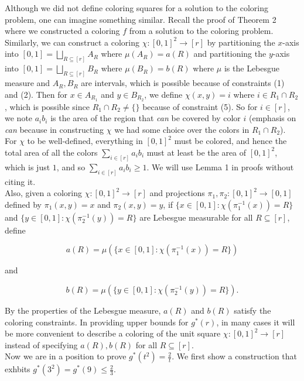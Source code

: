 \documentclass{article}
\begin{document}
Although we did not define coloring squares for a solution to the coloring problem, one can imagine something similar. Recall the proof of Theorem 2 where we constructed a coloring $f$ from a solution to the coloring problem. Similarly, we can construct a coloring $ \chi: [0,1]^2 \rightarrow [r]$ by partitioning the $x$-axis into $[0,1] = \bigsqcup_{R \subseteq [r]} A_R$ where $\mu (A_R) = a(R)$ and partitioning the $y$-axis into $[0,1] = \bigsqcup_{R \subseteq [r]} B_R$ where $\mu(B_R) = b(R)$ where $\mu$ is the Lebesgue measure and $A_R,B_R$ are intervals, which is possible because of constraints (1) and (2). Then for $x \in A_{R_1}$ and $y \in B_{R_2}$, we define $\chi (x,y) = i$ where $i \in R_1 \cap R_2$, which is possible since $R_1 \cap R_2 \neq \{\}$ because of constraint (5). So for $i \in [r]$, we note $a_ib_i$ is the area of the region that \textit{can} be covered by color $i$ (emphasis on \textit{can} because in constructing $\chi$ we had some choice over the colors in $R_1 \cap R_2$). For $\chi$ to be well-defined, everything in $[0,1]^2$ must be colored, and hence the total area of all the colors $\sum_{i \in [r]} a_ib_i$ must at least be the area of $[0,1]^2$, which is just $1$, and so  $\sum_{i \in [r]} a_ib_i \geq 1$. We will use Lemma 1 in proofs without citing it. \\

Also, given a coloring $\chi : [0,1]^2 \rightarrow [r]$ and projections $\pi_1,\pi_2 : [0,1]^2 \rightarrow [0,1]$ defined by $\pi_1(x,y) = x$ and $\pi_2(x,y) = y$, if $\{x \in [0,1] : \chi(\pi_1^{-1}(x)) = R\}$ and $\{y \in [0,1] : \chi(\pi_2^{-1}(y)) = R\}$ are  Lebesgue measurable for all $R \subseteq [r]$, define

$$a(R) = \mu(\{x \in [0,1] : \chi(\pi_1^{-1}(x)) = R\})$$

\noindent
and

$$b(R) = \mu(\{y \in [0,1] : \chi(\pi_2^{-1}(y)) = R\}).$$

\noindent
 By the properties of the Lebesgue measure, $a(R)$ and $b(R)$ satisfy the coloring constraints. In providing upper bounds for $g^*(r)$, in many cases it will be more convenient to describe a coloring of the unit square $\chi : [0,1]^2 \rightarrow [r]$ instead of specifying $a(R),b(R)$ for all $R \subseteq [r]$.  \\

Now we are in a position to prove $g^*(t^2) = \frac{2}{t}$. We first show a construction that exhbits $g^*(3^2) = g^*(9) \leq \frac{2}{3}$.
\end{document}
